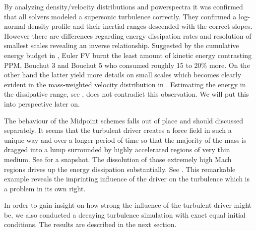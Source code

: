 By analyzing density/velocity distributions and powerspectra it was confirmed
that all solvers modeled a supersonic turbulence correctly. They confirmed a
log-normal density profile and their inertial ranges descended with the correct
slopes. However there are differences regarding energy dissipation rates and
resolution of smallest scales revealing an inverse relationship. Suggested by
the cumulative energy budget in
, Euler FV burnt the
least amount of kinetic energy contrasting PPM, Bouchut 3 and Bouchut 5 who
consumed roughly 15 to 20\% more. On the other hand the latter yield more
details on small scales which becomes clearly evident in the mass-weighted
velocity distribution in .
Estimating the energy in the dissipative range, see , does
not contradict this observation. We will put this into perspective later on.

The behaviour of the Midpoint schemes falls out of place and should discussed
separately. It seems that the turbulent driver creates a force field in such a
unique way and over a longer period of time so that the majority of the mass is
dragged into a lump surrounded by highly accelerated regions of very thin
medium. See  for a snapshot.
The dissolution of those extremely high Mach regions drives up the energy
dissipation substantially. See
.  This remarkable example
reveals the imprinting influence of the driver on the turbulence which is
a problem in its own right.

In order to gain insight on how strong the influence of the turbulent driver
might be, we also conducted a decaying turbulence simulation with exact equal
initial conditions. The results are described in the next section.
